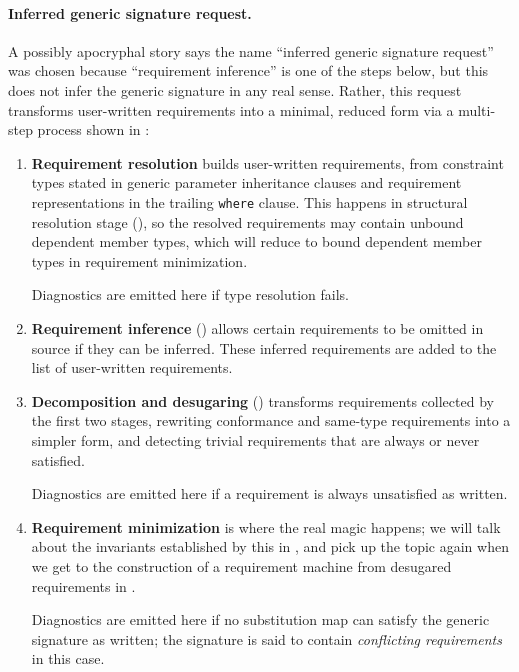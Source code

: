 \documentclass[../generics]{subfiles}
\begin{document}
\paragraph{Inferred generic signature request.} A possibly apocryphal story says the name ``inferred generic signature request'' was chosen because ``requirement inference'' is one of the steps below, but this does not infer the generic signature in any real sense. Rather, this request transforms user-written requirements into a minimal, reduced form via a multi-step process shown in :
\begin{enumerate}
\item {}\textbf{Requirement resolution} builds user-written requirements, from constraint types stated in generic parameter inheritance clauses and requirement representations in the trailing \texttt{where} clause. This happens in structural resolution stage  (), so the resolved requirements may contain unbound dependent member types, which will reduce to bound dependent member types in requirement minimization.

Diagnostics are emitted here if type resolution fails.

\item \textbf{Requirement inference} () allows certain requirements to be omitted in source if they can be inferred. These inferred requirements are added to the list of user-written requirements.

\item \textbf{Decomposition and desugaring} () transforms requirements collected by the first two stages, rewriting conformance and same-type requirements into a simpler form, and detecting trivial requirements that are always or never satisfied.

Diagnostics are emitted here if a requirement is always unsatisfied as written.

\item \textbf{Requirement minimization} is where the real magic happens; we will talk about the invariants established by this in , and pick up the topic again when we get to the construction of a requirement machine from desugared requirements in .

Diagnostics are emitted here if no substitution map can satisfy the generic signature as written; the signature is said to contain \emph{conflicting requirements} in this case.
\end{enumerate}
\end{document}
